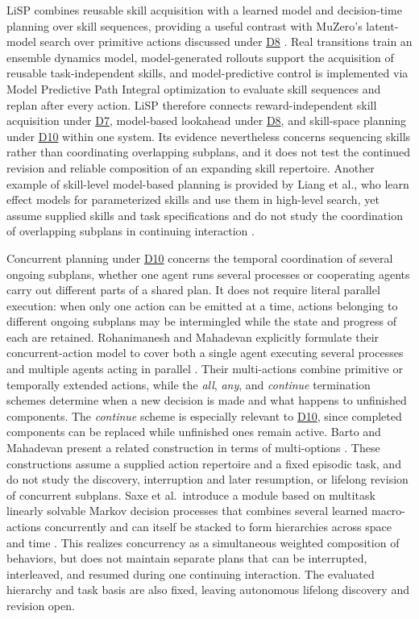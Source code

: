 \documentclass[10pt,journal,compsoc]{IEEEtran}
\DeclareRobustCommand{\Dref}[1]{\hyperref[sec:d#1]{D#1}}
\begin{document}
LiSP combines reusable skill acquisition with a learned model and decision-time planning over skill sequences, providing a useful contrast with MuZero's latent-model search over primitive actions discussed under \Dref{8} \cite{schrittwieser2020,lu2021}.
Real transitions train an ensemble dynamics model, model-generated rollouts support the acquisition of reusable task-independent skills, and model-predictive control is implemented via Model Predictive Path Integral optimization \cite{williams2017} to evaluate skill sequences and replan after every action.
LiSP therefore connects reward-independent skill acquisition under \Dref{7}, model-based lookahead under \Dref{8}, and skill-space planning under \Dref{10} within one system.
Its evidence nevertheless concerns sequencing skills rather than coordinating overlapping subplans, and it does not test the continued revision and reliable composition of an expanding skill repertoire.
Another example of skill-level model-based planning is provided by Liang et al., who learn effect models for parameterized skills and use them in high-level search, yet assume supplied skills and task specifications and do not study the coordination of overlapping subplans in continuing interaction \cite{liang2022}.

Concurrent planning under \Dref{10} concerns the temporal coordination of several ongoing subplans, whether one agent runs several processes or cooperating agents carry out different parts of a shared plan.
It does not require literal parallel execution: when only one action can be emitted at a time, actions belonging to different ongoing subplans may be intermingled while the state and progress of each are retained.
Rohanimanesh and Mahadevan explicitly formulate their concurrent-action model to cover both a single agent executing several processes and multiple agents acting in parallel \cite{rohanimanesh2002}.
Their multi-actions combine primitive or temporally extended actions, while the \emph{all}, \emph{any}, and \emph{continue} termination schemes determine when a new decision is made and what happens to unfinished components.
The \emph{continue} scheme is especially relevant to \Dref{10}, since completed components can be replaced while unfinished ones remain active.
Barto and Mahadevan present a related construction in terms of multi-options \cite{barto2003}.
These constructions assume a supplied action repertoire and a fixed episodic task, and do not study the discovery, interruption and later resumption, or lifelong revision of concurrent subplans.
Saxe et al.\ introduce a module based on multitask linearly solvable Markov decision processes that combines several learned macro-actions concurrently and can itself be stacked to form hierarchies across space and time \cite{saxe2017}.
This realizes concurrency as a simultaneous weighted composition of behaviors, but does not maintain separate plans that can be interrupted, interleaved, and resumed during one continuing interaction.
The evaluated hierarchy and task basis are also fixed, leaving autonomous lifelong discovery and revision open.
\end{document}
